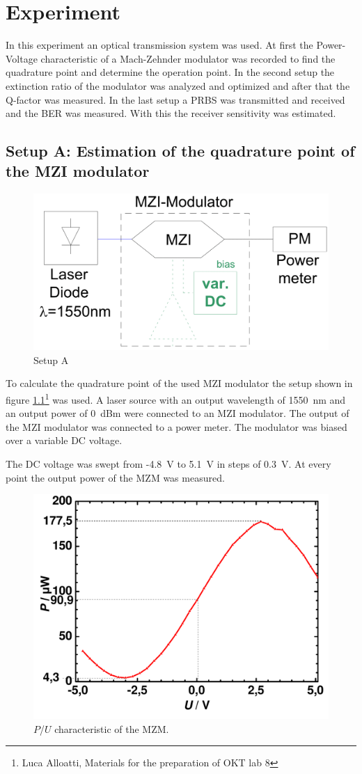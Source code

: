\chapter{Experiment}
In this experiment an optical transmission system was used. At first the Power-Voltage characteristic of a Mach-Zehnder modulator was recorded to find the quadrature point and determine the operation point. In the second setup the extinction ratio of the modulator was analyzed and optimized and after that the Q-factor was measured. In the last setup a PRBS was transmitted and received and the BER was measured. With this the receiver sensitivity was estimated.  

\section{Setup A: Estimation of the quadrature point of the MZI modulator}


\begin{figure}[t]%
\centering
\includegraphics[width=.5\columnwidth]{Grafiken/SetupA.png}%
\caption{Setup A}%
\label{fig:A_setup}%
\end{figure}



To calculate the quadrature point of the used MZI modulator the setup shown in figure \ref{fig:A_setup}\footnote[3]{Luca Alloatti, Materials for the preparation of OKT lab 8} was used. A laser source with an output wavelength of 1550~nm and an output power of 0~dBm were connected to an MZI modulator. The output of the MZI modulator was connected to a power meter. The modulator was biased over a variable DC voltage.

The DC voltage was swept from -4.8~V to 5.1~V in steps of 0.3~V. At every point the output power of the MZM was measured.

\begin{figure}%
\centering
\includegraphics[width=.6\columnwidth]{Grafiken/A_quadratur.pdf}%
\caption{$P$/$U$ characteristic of the MZM.}%
\label{fig:A_quadratur}%
\end{figure}

